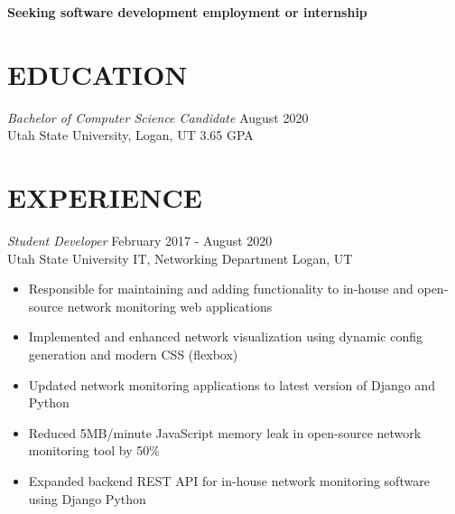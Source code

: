 \documentclass[10pt, resumewidth=7in]{res} %
\begin{document}
\centerline{\bf Seeking software development employment or internship}
\vspace{-1.0em}
\begin{resume}

%
%


\section{EDUCATION}

{\sl Bachelor of Computer Science Candidate}  \hfill August 2020 \\
Utah State University, Logan, UT \hfill 3.65 GPA



\section{EXPERIENCE}

{\sl Student Developer} \hfill February 2017 - August 2020 \\
Utah State University IT, Networking Department \hfill Logan, UT
\begin{itemize} \itemsep -2pt %
\item Responsible for maintaining and adding functionality to in-house and open-source network monitoring web applications
\item Implemented and enhanced network visualization using dynamic config generation and modern CSS (flexbox)
\item Updated network monitoring applications to latest version of Django and Python
\item Reduced 5MB/minute JavaScript memory leak in open-source network monitoring tool by 50\%
\item Expanded backend REST API for in-house network monitoring software using Django Python
\end{itemize}


\end{resume}
\end{document}
